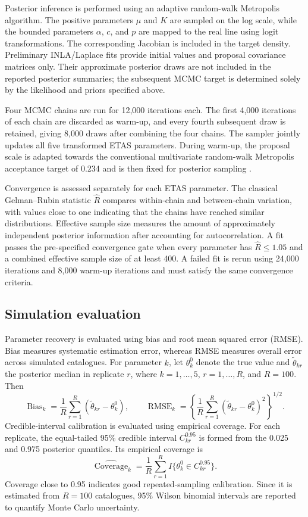 \documentclass{statsmsc}
\begin{document}
Posterior inference is performed using an adaptive random-walk Metropolis
algorithm. The positive parameters \(\mu\) and \(K\) are sampled on the log
scale, while the bounded parameters \(\alpha\), \(c\), and \(p\) are mapped
to the real line using logit transformations. The corresponding Jacobian is
included in the target density. Preliminary INLA/Laplace fits provide initial
values and proposal covariance matrices only. Their approximate posterior
draws are not included in the reported posterior summaries; the subsequent
MCMC target is determined solely by the likelihood and priors specified
above.

Four MCMC chains are run for 12,000 iterations each. The first 4,000
iterations of each chain are discarded as warm-up, and every fourth subsequent
draw is retained, giving 8,000 draws after combining the four chains. The
sampler jointly updates all five transformed ETAS parameters. During warm-up,
the proposal scale is adapted towards the conventional multivariate
random-walk Metropolis acceptance target of 0.234 and is then fixed for
posterior sampling \citep{roberts1997}.

Convergence is assessed separately for each ETAS parameter. The classical
Gelman--Rubin statistic \(\widehat R\) compares within-chain and between-chain
variation, with values close to one indicating that the chains have reached
similar distributions. Effective sample size measures the amount of
approximately independent posterior information after accounting for
autocorrelation. A fit passes the pre-specified convergence gate when every
parameter has \(\widehat R\leq1.05\) and a combined effective sample size of
at least 400. A failed fit is rerun using 24,000 iterations and 8,000 warm-up
iterations and must satisfy the same convergence criteria.

\subsection{Simulation evaluation}\label{subsec:evaluation}

Parameter recovery is evaluated using bias and root mean squared error
(RMSE). Bias measures systematic estimation error, whereas RMSE measures
overall error across simulated catalogues. For parameter \(k\), let
\(\theta_k^0\) denote the true value and \(\widetilde{\theta}_{kr}\) the
posterior median in replicate \(r\), where \(k=1,\ldots,5\),
\(r=1,\ldots,R\), and \(R=100\). Then
\[
\operatorname{Bias}_k
=
\frac{1}{R}\sum_{r=1}^{R}
(\widetilde{\theta}_{kr}-\theta_k^0),
\qquad
\operatorname{RMSE}_k
=
\left\{
\frac{1}{R}\sum_{r=1}^{R}
(\widetilde{\theta}_{kr}-\theta_k^0)^2
\right\}^{1/2}.
\]
Credible-interval calibration is evaluated using empirical coverage. For each
replicate, the equal-tailed 95\% credible interval \(C_{kr}^{0.95}\) is formed
from the 0.025 and 0.975 posterior quantiles. Its empirical coverage is
\[
\widehat{\operatorname{Coverage}}_k
=
\frac{1}{R}\sum_{r=1}^{R}
I\{\theta_k^0\in C_{kr}^{0.95}\}.
\]
Coverage close to 0.95 indicates good repeated-sampling calibration. Since it
is estimated from \(R=100\) catalogues, 95\% Wilson binomial intervals are
reported to quantify Monte Carlo uncertainty.
\end{document}
